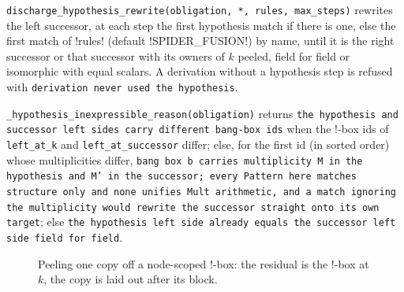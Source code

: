 \begin{signature}
\texttt{discharge\_\allowbreak{}hypothesis\_\allowbreak{}rewrite(\allowbreak{}obligation,\allowbreak{} *,\allowbreak{} rules,\allowbreak{} max\_\allowbreak{}steps)} rewrites the left successor, at each step the first hypothesis match if there is one, else the first match of \code!rules! (default \py!SPIDER_FUSION!) by name, until it is the right successor or that successor with its owners of $k$ peeled, field for field or isomorphic with equal scalars. A derivation without a hypothesis step is refused with \texttt{derivation never used the hypothesis}.
\end{signature}

\texttt{\_\allowbreak{}hypothesis\_\allowbreak{}inexpressible\_\allowbreak{}reason(\allowbreak{}obligation)} returns \texttt{the hypothesis and successor left sides carry different bang-box ids} when the !-box ids of \texttt{left\_at\_k} and \texttt{left\_at\_successor} differ; else, for the first id (in sorted order) whose multiplicities differ, \texttt{bang box b carries multiplicity M in the hypothesis and M' in the successor; every Pattern here matches structure only and none unifies Mult arithmetic,\allowbreak{} and a match ignoring the multiplicity would rewrite the successor straight onto its own target}; else \texttt{the hypothesis left side already equals the successor left side field for field}.

\begin{figure}[H]
\centering
{}
\caption{Peeling one copy off a node-scoped !-box: the residual is the !-box at $k$, the copy is laid out after its block.}\label{fig:kernel-peel}
\end{figure}

